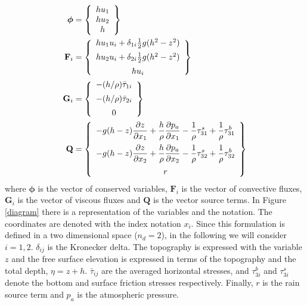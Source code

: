 \begin{subequations}\label{variables_and_fluxes}
\allowdisplaybreaks
\begin{align}
\bm{\phi} &= \left\{
    \begin{array}{c}
        hu_1 \\
        hu_2 \\
        h
    \end{array}\right\} \\
\mathbf{F}_i &= \left\{
    \begin{array}{c}
        hu_1u_i + \delta_{1i}\frac{1}{2}g(h^2 - z^2) \\ [5pt]
        hu_2u_i + \delta_{2i}\frac{1}{2}g(h^2 - z^2) \\ [5pt]
        hu_i
    \end{array}\right\} \\
\mathbf{G}_i &= \left\{
    \begin{array}{c}
        -(h/\rho) \bar{\tau}_{1i} \\ [5pt]
        -(h/\rho) \bar{\tau}_{2i} \\ [5pt]
        0
    \end{array}\right\} \\
\mathbf{Q} &= \left\{
    \begin{array}{c}
        \displaystyle -g(h-z)\pder{z}{x_1} + \frac{h}{\rho}\pder{p_a}{x_1}
        - \frac{1}{\rho}\tau^s_{31} + \frac{1}{\rho}\tau^b_{31} \\ [10pt]
        \displaystyle -g(h-z)\pder{z}{x_2} + \frac{h}{\rho}\pder{p_a}{x_2}
        - \frac{1}{\rho}\tau^s_{32} + \frac{1}{\rho}\tau^b_{32} \\ [10pt]
        r
    \end{array}\right\}
\end{align}
\end{subequations}
where $\bm{\phi}$ is the vector of conserved variables, $\mathbf{F}_i$ is the vector of convective fluxes, $\mathbf{G}_i$ is the vector of viscous fluxes and $\mathbf{Q}$ is the vector source terms. In Figure \ref{diagram} there is a representation of the variables and the notation. The coordinates are denoted with the index notation $x_i$. Since this formulation is defined in a two dimensional space ($n_d=2$), in the following we will consider $i=1,2$.
$\delta_{ij}$ is the Kronecker delta. The topography is expressed with the variable $z$ and the free surface elevation is expressed in terms of the topography and the total depth, $\eta = z + h$. $\bar{\tau}_{ij}$ are the averaged horizontal stresses, and $\tau^b_{3i}$ and $\tau^s_{3i}$ denote the bottom and surface friction stresses respectively. Finally, $r$ is the rain source term and $p_a$ is the atmospheric pressure.


